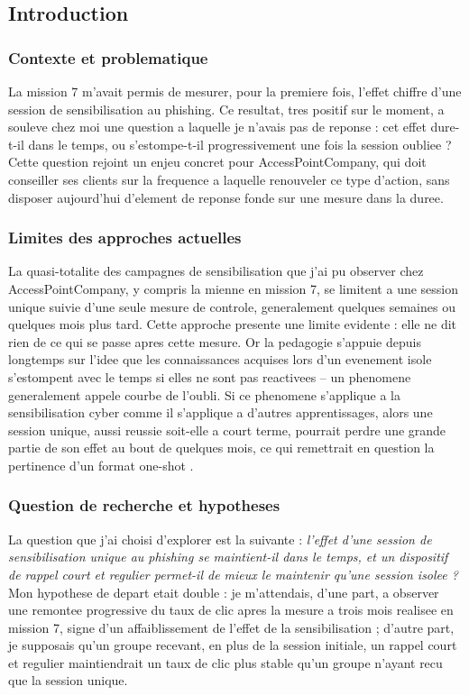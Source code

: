 \documentclass[11pt,a4paper]{article}
\begin{document}
\subsection{Introduction}

\subsubsection*{Contexte et problematique}

La mission 7 m'avait permis de mesurer, pour la premiere fois, l'effet chiffre d'une session de sensibilisation au phishing. Ce resultat, tres positif sur le moment, a souleve chez moi une question a laquelle je n'avais pas de reponse : cet effet dure-t-il dans le temps, ou s'estompe-t-il progressivement une fois la session oubliee ? Cette question rejoint un enjeu concret pour AccessPointCompany, qui doit conseiller ses clients sur la frequence a laquelle renouveler ce type d'action, sans disposer aujourd'hui d'element de reponse fonde sur une mesure dans la duree.

\subsubsection*{Limites des approches actuelles}

La quasi-totalite des campagnes de sensibilisation que j'ai pu observer chez AccessPointCompany, y compris la mienne en mission 7, se limitent a une session unique suivie d'une seule mesure de controle, generalement quelques semaines ou quelques mois plus tard. Cette approche presente une limite evidente : elle ne dit rien de ce qui se passe apres cette mesure. Or la pedagogie s'appuie depuis longtemps sur l'idee que les connaissances acquises lors d'un evenement isole s'estompent avec le temps si elles ne sont pas reactivees -- un phenomene generalement appele courbe de l'oubli. Si ce phenomene s'applique a la sensibilisation cyber comme il s'applique a d'autres apprentissages, alors une session unique, aussi reussie soit-elle a court terme, pourrait perdre une grande partie de son effet au bout de quelques mois, ce qui remettrait en question la pertinence d'un format \guillemotleft one-shot \guillemotright.

\subsubsection*{Question de recherche et hypotheses}

La question que j'ai choisi d'explorer est la suivante : \emph{l'effet d'une session de sensibilisation unique au phishing se maintient-il dans le temps, et un dispositif de rappel court et regulier permet-il de mieux le maintenir qu'une session isolee ?} Mon hypothese de depart etait double : je m'attendais, d'une part, a observer une remontee progressive du taux de clic apres la mesure a trois mois realisee en mission 7, signe d'un affaiblissement de l'effet de la sensibilisation ; d'autre part, je supposais qu'un groupe recevant, en plus de la session initiale, un rappel court et regulier maintiendrait un taux de clic plus stable qu'un groupe n'ayant recu que la session unique.
\end{document}
